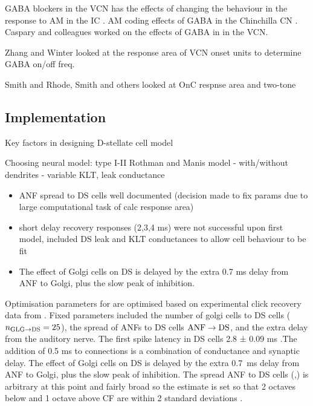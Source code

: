 \medskip{}

  GABA
blockers in the VCN has the effects of changing the behaviour in the
response to AM in the IC \citep{CasparyPalombiEtAl:2002}.  AM coding
effects of GABA in the Chinchilla CN  \citep{BackoffShadduckEtAl:1999}.  \citep{CasparyBackoffEtAl:1994}
Caspary and colleagues worked on the effects of GABA in in the VCN\@.

Zhang and Winter looked at the response area of VCN onset units to
determine GABA on/off freq.

Smith and Rhode, Smith and others looked at OnC respnse area and two-tone



\subsection{Implementation}
 
Key factors in designing D-stellate cell model

\medskip{}

Choosing neural model: type I-II Rothman and Manis model
  - with/without dendrites
  - variable KLT, leak conductance

\begin{itemize}
\item  ANF spread to DS cells well documented (decision made to
    fix params due to large computational task of calc response area) 
\item  short delay recovery responses (2,3,4 ms) were not successful upon
    first model, included DS leak and KLT conductances to allow cell
    behaviour to be fit
\item The effect of Golgi cells on DS is delayed by the extra 0.7 ms
    delay from ANF to Golgi, plus the slow peak of \GABAa inhibition.
\end{itemize}

\medskip{}

Optimisation parameters for \GLGDS are optimised based on experimental
click recovery data from \citep{BackoffPalombiEtAl:1997}.  Fixed
parameters included the number of golgi cells to DS cells ($\protect n_{\protect\textrm{{GLG}}\to\textrm{{DS}}} =
25$), the spread of ANFs to DS cells $\protect\textrm{{ANF}}\to\textrm{{DS}}$, and the extra delay
from the auditory nerve.  The first spike latency in DS cells 2.8 ±
0.09 ms \citep{RhodeSmith:1986}.The addition of 0.5 ms to \ANFDS
connections is a combination of conductance and synaptic delay. The
effect of Golgi cells on DS is delayed by the extra 0.7~ms delay from
ANF to Golgi, plus the slow peak of \GABAa inhibition.  The spread ANF
to DS cells (\sANFDSh,\sANFDSl) is arbitrary at this point and fairly
broad so the estimate is set so that 2 octaves below and 1 octave
above CF are within 2 standard deviations \citep{PaoliniClark:1999}.
\medskip{}

